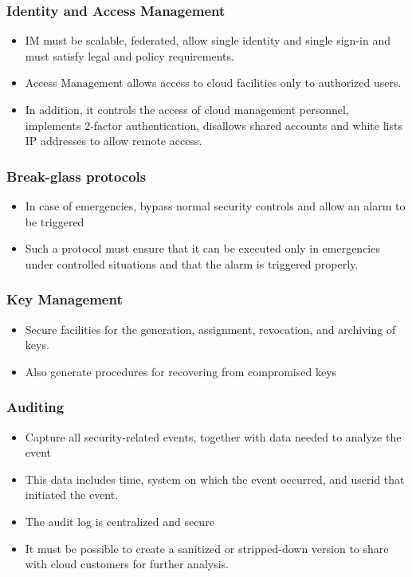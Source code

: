 \documentclass{article}
\begin{document}
\subsubsection{Identity and Access Management}
\begin{itemize}
    \item IM must be scalable, federated, allow single identity and single sign-in and must satisfy legal and policy requirements. 
    
    \item Access Management allows access to cloud facilities only to authorized users. 
    
    \item In addition, it controls the access of cloud management personnel, implements 2-factor authentication, disallows shared accounts and white lists IP addresses to allow remote access. 
\end{itemize}

\subsubsection{Break-glass protocols}
\begin{itemize}
    \item In case of emergencies, bypass normal security controls and allow an alarm to be triggered
    
    \item Such a protocol must ensure that it can be executed only in emergencies under controlled situations and that the alarm is triggered properly. 
\end{itemize}

\subsubsection{Key Management}
\begin{itemize}
    \item Secure facilities for the generation, assignment, revocation, and archiving of keys. 
    
    \item Also generate procedures for recovering from compromised keys
\end{itemize}

\subsubsection{Auditing}
\begin{itemize}
    \item Capture all security-related events, together with data needed to analyze the event 
    
    \item This data includes time, system on which the event occurred, and userid that initiated the event. 
    
    \item The audit log is centralized and secure
    
    \item It must be possible to create a sanitized or stripped-down version to share with cloud customers for further analysis. 
\end{itemize}
\end{document}
